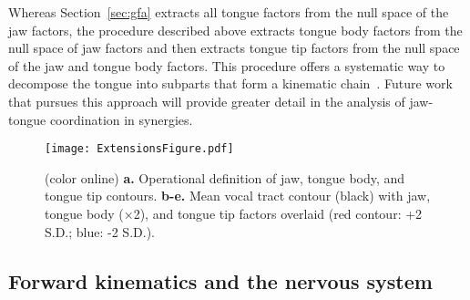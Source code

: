 \documentclass[preprint]{JASAnew}\usepackage[]{graphicx}\usepackage[]{color}
\begin{document}
Whereas Section~\ref{sec:gfa} extracts all tongue factors from the null space of the jaw factors, the procedure described above extracts tongue body factors from the null space of jaw factors and then extracts tongue tip factors from the null space of the jaw and tongue body factors.
This procedure offers a systematic way to decompose the tongue into subparts that form a kinematic chain~\cite{craig2005introduction}. Future work that pursues this approach will provide greater detail in the analysis of jaw-tongue coordination in synergies.

\begin{figure}

\texttt{[image: ExtensionsFigure.pdf]}

\caption{(color online) {\bf a.} Operational definition of jaw, tongue body, and tongue tip contours.
{\bf b-e.} Mean vocal tract contour (black) with jaw, tongue body ($\times$\num{2}), and tongue tip factors overlaid (red contour: +\num{2} S.D.; blue: -\num{2} S.D.).}
\label{fig:extensionsfigure}
\end{figure}





\subsection{Forward kinematics and the nervous system}
\end{document}
